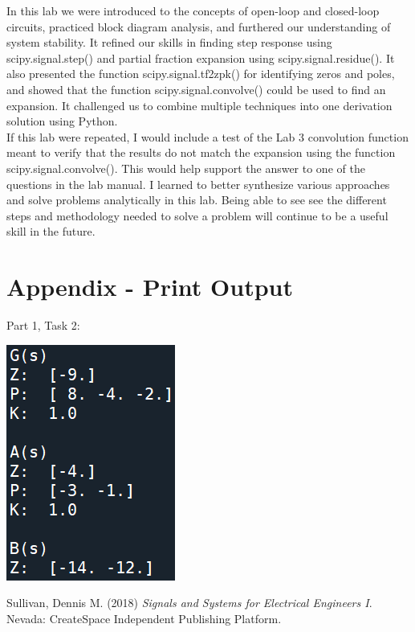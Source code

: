 \documentclass[12pt]{report}
\begin{document}
In this lab we were introduced to the concepts of open-loop and closed-loop circuits, practiced block diagram analysis, and furthered our understanding of system stability. It refined our skills in finding step response using scipy.signal.step() and partial fraction expansion using scipy.signal.residue(). It also presented the function scipy.signal.tf2zpk() for identifying zeros and poles, and showed that the function scipy.signal.convolve() could be used to find an expansion. It challenged us to combine multiple techniques into one derivation solution using Python. \\

If this lab were repeated, I would include a test of the Lab 3 convolution function meant to verify that the results do not match the expansion using the function scipy.signal.convolve(). This would help support the answer to one of the questions in the lab manual. I learned to better synthesize various approaches and solve problems analytically in this lab. Being able to see see the different steps and methodology needed to solve a problem will continue to be a useful skill in the future. \\

\newpage
\appendix
\section*{Appendix - Print Output}

Part 1, Task 2:
\begin{center}
	\includegraphics[scale = 1.25]{Lab 7 - Print Output/Part1-Task2.png}\\[1.0 cm]
\end{center}

\newpage
\begin{thebibliography}{111}
		
	Sullivan, Dennis M. (2018) {\it  Signals and Systems for Electrical Engineers I}. Nevada: CreateSpace Independent Publishing Platform.
		
\end{thebibliography}
\end{document}
